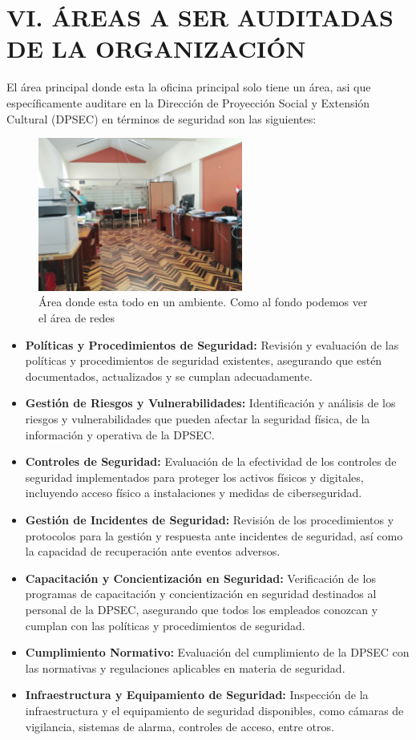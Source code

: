 \documentclass[12pt,a4paper]{article}
\begin{document}
\section{VI. ÁREAS A SER AUDITADAS DE LA ORGANIZACIÓN}
El área principal donde esta la oficina principal solo tiene un área, asi que específicamente auditare en la Dirección de Proyección Social y Extensión Cultural (DPSEC) en términos de seguridad son las siguientes:
\begin{figure}[!htb]
    \centering
    \includegraphics[width=0.6\textwidth]{images/AreaTrabajo.jpeg}
    \caption{Área donde esta todo en un ambiente. Como al fondo podemos ver el área de redes}
    
\end{figure}
\begin{itemize}
    \item \textbf{Políticas y Procedimientos de Seguridad:} Revisión y evaluación de las políticas y procedimientos de seguridad existentes, asegurando que estén documentados, actualizados y se cumplan adecuadamente.
    \item \textbf{Gestión de Riesgos y Vulnerabilidades:} Identificación y análisis de los riesgos y vulnerabilidades que pueden afectar la seguridad física, de la información y operativa de la DPSEC.
    \item \textbf{Controles de Seguridad:} Evaluación de la efectividad de los controles de seguridad implementados para proteger los activos físicos y digitales, incluyendo acceso físico a instalaciones y medidas de ciberseguridad.
    \item \textbf{Gestión de Incidentes de Seguridad:} Revisión de los procedimientos y protocolos para la gestión y respuesta ante incidentes de seguridad, así como la capacidad de recuperación ante eventos adversos.
    \item \textbf{Capacitación y Concientización en Seguridad:} Verificación de los programas de capacitación y concientización en seguridad destinados al personal de la DPSEC, asegurando que todos los empleados conozcan y cumplan con las políticas y procedimientos de seguridad.
    \item \textbf{Cumplimiento Normativo:} Evaluación del cumplimiento de la DPSEC con las normativas y regulaciones aplicables en materia de seguridad.
    \item \textbf{Infraestructura y Equipamiento de Seguridad:} Inspección de la infraestructura y el equipamiento de seguridad disponibles, como cámaras de vigilancia, sistemas de alarma, controles de acceso, entre otros.
    
\end{itemize}
\end{document}
